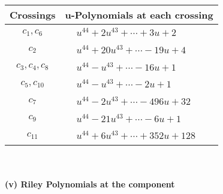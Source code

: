 \documentclass[1p]{elsarticle_modified}
\theoremstyle{definition}
\begin{document}
\begin{tabular}{m{50pt}|m{274pt}}
Crossings & \hspace{64pt}u-Polynomials at each crossing \\
\hline $$\begin{aligned}c_{1},c_{6}\end{aligned}$$&$\begin{aligned}
&u^{44}+2 u^{43}+\cdots+3 u+2
\end{aligned}$\\
\hline $$\begin{aligned}c_{2}\end{aligned}$$&$\begin{aligned}
&u^{44}+20 u^{43}+\cdots-19 u+4
\end{aligned}$\\
\hline $$\begin{aligned}c_{3},c_{4},c_{8}\end{aligned}$$&$\begin{aligned}
&u^{44}- u^{43}+\cdots-16 u+1
\end{aligned}$\\
\hline $$\begin{aligned}c_{5},c_{10}\end{aligned}$$&$\begin{aligned}
&u^{44}- u^{43}+\cdots-2 u+1
\end{aligned}$\\
\hline $$\begin{aligned}c_{7}\end{aligned}$$&$\begin{aligned}
&u^{44}-2 u^{43}+\cdots-496 u+32
\end{aligned}$\\
\hline $$\begin{aligned}c_{9}\end{aligned}$$&$\begin{aligned}
&u^{44}-21 u^{43}+\cdots-6 u+1
\end{aligned}$\\
\hline $$\begin{aligned}c_{11}\end{aligned}$$&$\begin{aligned}
&u^{44}+6 u^{43}+\cdots+352 u+128
\end{aligned}$\\
\hline
\end{tabular}\\~\\
\newpage\renewcommand{\arraystretch}{1}
\flushleft \textbf{(v) Riley Polynomials at the component}\newline \\
\end{document}
